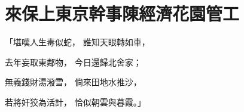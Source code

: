 %

\chapter{來保上東京幹事\KG 陳經濟花園管工}

\begin{showcontents}{}



「堪嘆人生毒似蛇，  誰知天眼轉如車，

去年妄取東鄰物，  今日還歸北舍家；

無義錢財湯潑雪，  倘來田地水推沙，

若將奸狡為活計，  恰似朝雲與暮霞。」


\end{showcontents}
